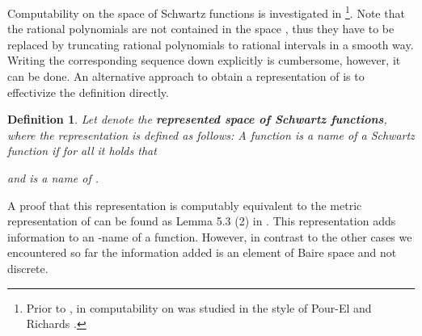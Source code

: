 \documentclass{eptcs-modified}
\newtheorem{definition}[theorem]{Definition}
\newcommand{\demph}{\textbf}
\begin{document}
			Computability on the space  of Schwartz functions is investigated in \cite{zhong}\footnote{Prior to \cite{zhong}, in \cite{washihara} computability on  was studied in the style of Pour-El and Richards \cite{MR1005942}.}.
			Note that the rational polynomials are not contained in the space , thus they have to be replaced by truncating rational polynomials to rational intervals in a smooth way.
			Writing the corresponding sequence down explicitly is cumbersome, however, it can be done.
			An alternative approach to obtain a representation of  is to effectivize the definition directly.
			\begin{definition}\label{def:schwartz representation}
				Let  denote the \demph{represented space of Schwartz functions}, where the representation is defined as follows:
				A function  is a name of a Schwartz function  if for all  it holds that
				
				and  is a name of .
			\end{definition}
			A proof that this representation is computably equivalent to the metric representation of  can be found as Lemma 5.3 (2) in \cite{zhong}.
			This representation adds information to an -name of a function.
			However, in contrast to the other cases we encountered so far the information added is an element of Baire space and not discrete.
			
\end{document}
